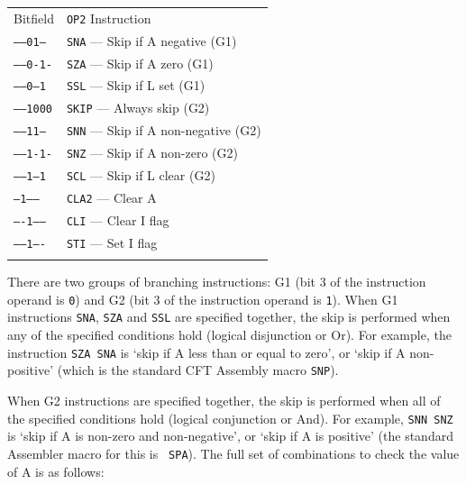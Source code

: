 \documentclass[11pt,a4paper,twocolumns]{article}
\begin{document}
\vspace{1em}\noindent\begin{center}
\begin{tabular}{ll}
  Bitfield & {\tt OP2} Instruction \\\noalign{\smallskip}\hline\noalign{\smallskip}
  {\tt ------01--} & {\tt SNA} — Skip if A negative (G1)\\
  {\tt ------0-1-} & {\tt SZA} — Skip if A zero (G1) \\
  {\tt ------0--1} & {\tt SSL} — Skip if L set (G1) \\
  {\tt ------1000} & {\tt SKIP} — Always skip (G2) \\
  {\tt ------11--} & {\tt SNN} — Skip if A non-negative (G2) \\
  {\tt ------1-1-} & {\tt SNZ} — Skip if A non-zero (G2) \\
  {\tt ------1--1} & {\tt SCL} — Skip if L clear (G2) \\
  {\tt ---1------} & {\tt CLA2} — Clear A \\
  {\tt ----1-----} & {\tt CLI} — Clear I flag \\
  {\tt -----1----} & {\tt STI} — Set I flag \\%
  \noalign{\smallskip}\hline\noalign{\smallskip}
\end{tabular}
\end{center}\vspace{1em}

There are two groups of branching instructions: G1 (bit 3 of the
instruction operand is {\tt 0}) and G2 (bit 3 of the instruction
operand is {\tt 1}). When G1 instructions {\tt SNA}, {\tt SZA} and
{\tt SSL} are specified together, the skip is performed when any of
the specified conditions hold (logical disjunction or Or). For example, the
instruction {\tt SZA SNA} is ‘skip if A less than or equal to zero’,
or ‘skip if A non-positive’ (which is the standard CFT Assembly macro
{\tt SNP}).

When G2 instructions are specified together, the skip is performed
when all of the specified conditions hold (logical conjunction or And). For
example, {\tt SNN SNZ} is ‘skip if A is non-zero and non-negative’, or
‘skip if A is positive’ (the standard Assembler macro for this is {\tt
  SPA}). The full set of combinations to check the value of A is as
follows:
\end{document}
